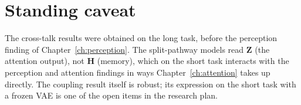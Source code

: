\section{Standing caveat}
The cross-talk results were obtained on the long task, before the perception finding of
Chapter~\ref{ch:perception}. The split-pathway models read $\mathbf Z$ (the attention
output), not $\mathbf H$ (memory), which on the short task interacts with the perception
and attention findings in ways Chapter~\ref{ch:attention} takes up directly. The coupling
result itself is robust; its expression on the short task with a frozen VAE is one of the
open items in the research plan.
